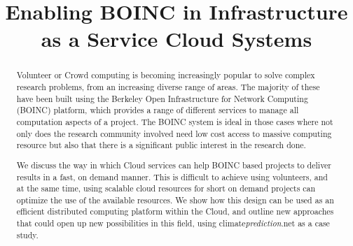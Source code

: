 \documentclass[journal abbreviation, manuscript]{copernicus}
\begin{document}
\title{Enabling BOINC in Infrastructure as a Service Cloud Systems}









\received{}
\pubdiscuss{} %
\revised{}
\accepted{}
\published{}




\maketitle



\begin{abstract}
Volunteer or Crowd computing is becoming increasingly popular to solve complex research problems, from an increasing diverse range of areas. The majority of these have been built using the Berkeley Open Infrastructure for Network Computing (BOINC) platform, which provides a range of different services to manage all computation aspects of a project. The BOINC system is ideal in those cases where not only does the research community involved need low cost access to massive computing resource but also that there is a significant public interest in the research done.

We discuss the way in which Cloud services can help BOINC based projects to deliver results in a fast, on demand manner. This is difficult to achieve using volunteers, and at the same time, using scalable cloud resources for short on demand projects can optimize the use of the available resources. We show how this design can be used as an efficient distributed computing platform within the Cloud, and outline new approaches that could open up new possibilities in this field, using climate\textit{prediction}.net as a case study.

\end{abstract}
\end{document}
